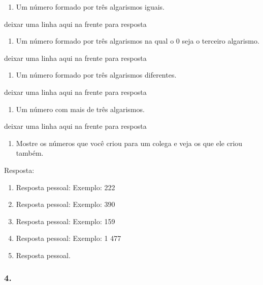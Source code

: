 \begin{enumerate}
\def\labelenumi{\alph{enumi})}
\item
  Um número formado por três algarismos iguais.
\end{enumerate}

deixar uma linha aqui na frente para resposta

\begin{enumerate}
\def\labelenumi{\alph{enumi})}
\item
  Um número formado por três algarismos na qual o 0 seja o terceiro
  algarismo.
\end{enumerate}

deixar uma linha aqui na frente para resposta

\begin{enumerate}
\def\labelenumi{\alph{enumi})}
\item
  Um número formado por três algarismos diferentes.
\end{enumerate}

deixar uma linha aqui na frente para resposta

\begin{enumerate}
\def\labelenumi{\alph{enumi})}
\item
  Um número com mais de três algarismos.
\end{enumerate}

deixar uma linha aqui na frente para resposta

\begin{enumerate}
\def\labelenumi{\alph{enumi})}
\item
  Mostre os números que você criou para um colega e veja os que ele
  criou também.
\end{enumerate}

Resposta:

\begin{enumerate}
\def\labelenumi{\alph{enumi})}
\item
  Resposta pessoal: Exemplo: 222
\item
  Resposta pessoal: Exemplo: 390
\item
  Resposta pessoal: Exemplo: 159
\item
  Resposta pessoal: Exemplo: 1 477
\item
  Resposta pessoal.
\end{enumerate}

\subsubsection{4.}\label{section-3}

